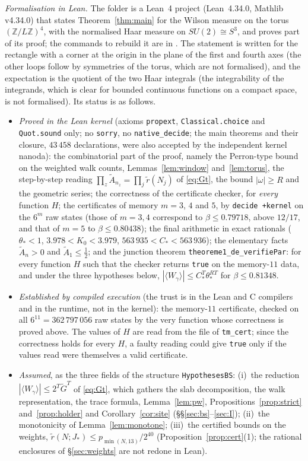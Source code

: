 \documentclass[11pt,a4paper]{article}
\theoremstyle{plain}
\theoremstyle{remark}
\numberwithin{equation}{section}
\newcommand{\Z}{\mathbb{Z}}
\newcommand{\At}{\widetilde A}
\newcommand{\rt}{\widetilde r}
\newcommand{\Gt}{\widetilde G}
\begin{document}
\medskip
\noindent\emph{Formalisation in Lean.} The folder  is a Lean~4 project (Lean~4.34.0, Mathlib v4.34.0) that states
Theorem~\ref{thm:main} for the Wilson measure on the torus $(\Z/L\Z)^4$, with the normalised Haar measure on $SU(2)\cong S^3$, and proves
part of its proof; the commands to rebuild it are in . The statement is written for the rectangle with a
corner at the origin in the plane of the first and fourth axes (the other loops follow by symmetries of the torus, which are not
formalised), and the expectation is the quotient of the two Haar integrals (the integrability of the integrands, which is clear for bounded
continuous functions on a compact space, is not formalised). Its status is as follows.
\begin{itemize}
\item \emph{Proved in the Lean kernel} (axioms \texttt{propext}, \texttt{Classical.choice} and \texttt{Quot.sound} only; no
\texttt{sorry}, no \texttt{native\_decide}; the main theorems and their closure, $43\,458$ declarations, were also accepted by the
independent kernel nanoda): the combinatorial part of the proof, namely the Perron-type bound on the weighted walk counts,
Lemmas~\ref{lem:window} and~\ref{lem:torus}, the step-by-step reading $\prod_z\At_{n_z}=\prod_j\rt(N_j)$ of \eqref{eq:Gt}, the bound
$|\omega|\ge R$ and the geometric series; the correctness of the certificate checker, for \emph{every} function $H$; the certificates of
memory $m=3$, $4$ and $5$, by \texttt{decide +kernel} on the $6^m$ raw states (those of $m=3,4$ correspond to $\beta\le0.79718$, above
$12/17$, and that of $m=5$ to $\beta\le0.80438$); the final arithmetic in exact rationals ($\theta_*<1$, $3.978<K_0<3.979$,
$563\,935<C_*<563\,936$); the elementary facts $\At_n>0$ and $\At_1\le\frac12$; and the junction theorem
\texttt{theoreme1\_de\_verifiePar}: for every function $H$ such that the checker returns \texttt{true} on the memory-$11$ data, and under
the three hypotheses below, $|\langle W_\gamma\rangle|\le C_*^T\theta_*^{RT}$ for $\beta\le0.81348$.
\item \emph{Established by compiled execution} (the trust is in the Lean and C compilers and in the runtime, not in the kernel): the
memory-$11$ certificate, checked on all $6^{11}=362\,797\,056$ raw states by the very function whose correctness is proved above. The
values of $H$ are read from the file of \texttt{tm\_cert}; since the correctness holds for every $H$, a faulty reading could give
\texttt{true} only if the values read were themselves a valid certificate.
\item \emph{Assumed}, as the three fields of the structure \texttt{HypothesesBS}: (i)~the reduction $|\langle W_\gamma\rangle|\le2^T\Gt^T$
of \eqref{eq:Gt}, which gathers the slab decomposition, the walk representation, the trace formula, Lemma~\ref{lem:pw},
Propositions~\ref{prop:strict} and~\ref{prop:holder} and Corollary~\ref{cor:site} (\S\S\ref{sec:bs}--\ref{sec:I}); (ii)~the monotonicity of
Lemma~\ref{lem:monotone}; (iii)~the certified bounds on the weights, $\rt(N;J_*)\le p_{\min(N,13)}/2^{40}$
(Proposition~\ref{prop:cert}(1); the rational enclosures of \S\ref{sec:weights} are not redone in Lean).
\end{itemize}
\end{document}
